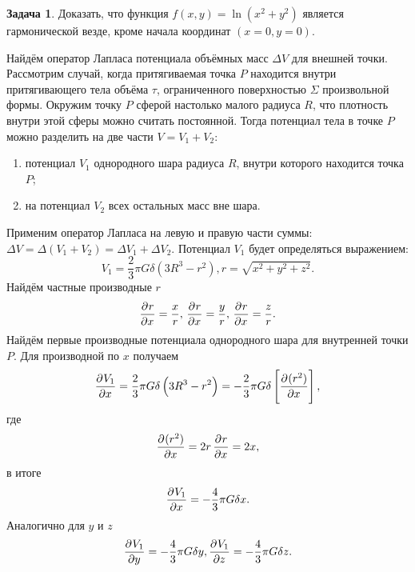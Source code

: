 \documentclass[11pt, a4paper]{article}
\theoremstyle{plain}
\theoremstyle{definition}
\newtheorem{problem}{Задача}[section]
\theoremstyle{remark}
\begin{document}
\begin{problem}
Доказать, что функция $f (x, y) = \ln (x^2 + y^2)$ является гармонической везде, кроме начала координат $(x = 0, y = 0)$.
\end{problem}

Найдём оператор Лапласа потенциала объёмных масс $\Delta V$ для внешней точки. Рассмотрим случай, когда притягиваемая точка $P$ находится внутри притягивающего тела объёма $\tau$, ограниченного поверхностью $\Sigma$ произвольной формы. Окружим точку $P$ сферой настолько малого радиуса $R$, что плотность внутри этой сферы можно считать постоянной. Тогда потенциал тела в точке $P$ можно разделить на две части $V = V_1 + V_2$:
\begin{enumerate}
	\item потенциал $V_1$ однородного шара радиуса $R$, внутри которого находится точка $P$;
	\item на потенциал $V_2$ всех остальных масс вне шара.
\end{enumerate}
Применим оператор Лапласа на левую и правую части суммы: $\Delta V = \Delta (V_1 + V_2) = \Delta V_1 + \Delta V_2$.
Потенциал $V_1$ будет определяться выражением:
\begin{equation*}
	V_1 = \dfrac{2}{3} \pi G \delta \left(3R^3 - r^2 \right), 
	r = \sqrt{x^2 + y^2 + z^2}.
\end{equation*}
Найдём частные производные $r$
\begin{equation*}
	\dpd{r}{x} = \dfrac{x}{r}, \\
	\dpd{r}{x} = \dfrac{y}{r}, \\
	\dpd{r}{x} = \dfrac{z}{r}. 
\end{equation*}
Найдём первые производные потенциала однородного шара для внутренней точки $P$. Для производной по $x$ получаем
\begin{equation*}
	\dpd{V_1}{x} = \dfrac{2}{3} \pi G \delta \left(3R^3 - r^2 \right) = - \dfrac{2}{3} \pi G \delta \left[\dpd{(r^{2})}{x} \right],
\end{equation*}
где
\begin{equation*}
	\dpd{(r^{2})}{x} = 2 r \dpd{r}{x} = 2x,
\end{equation*}
в итоге
\begin{equation*}
    \dpd{V_1}{x} = - \dfrac{4}{3} \pi G \delta x.
\end{equation*}
Аналогично для $y$ и $z$
\begin{equation*}	
    \dpd{V_1}{y} = - \dfrac{4}{3} \pi G \delta y, 
    \dpd{V_1}{z} = - \dfrac{4}{3} \pi G \delta z.
\end{equation*}
\end{document}
